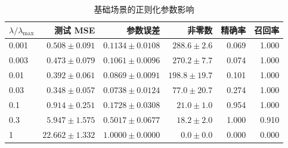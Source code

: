 \begin{table}[htbp]
\centering\small
\caption{基础场景的正则化参数影响}\label{tab:regularization}
\begin{tabular}{lrrrrr}
\toprule
$\lambda/\lambda_{\max}$ & 测试 MSE & 参数误差 & 非零数 & 精确率 & 召回率 \\
\midrule
0.001 & $0.508\pm0.091$ & $0.1134\pm0.0108$ & $288.6\pm2.6$ & 0.069 & 1.000 \\
0.003 & $0.473\pm0.079$ & $0.1061\pm0.0096$ & $270.2\pm7.7$ & 0.074 & 1.000 \\
0.01 & $0.392\pm0.061$ & $0.0869\pm0.0091$ & $198.8\pm19.7$ & 0.101 & 1.000 \\
0.03 & $0.348\pm0.057$ & $0.0738\pm0.0124$ & $77.0\pm20.7$ & 0.274 & 1.000 \\
0.1 & $0.914\pm0.251$ & $0.1728\pm0.0308$ & $21.0\pm1.0$ & 0.954 & 1.000 \\
0.3 & $5.947\pm1.575$ & $0.5017\pm0.0677$ & $18.2\pm2.0$ & 1.000 & 0.910 \\
1 & $22.662\pm1.332$ & $1.0000\pm0.0000$ & $0.0\pm0.0$ & 0.000 & 0.000 \\
\bottomrule
\end{tabular}
\par\vspace{0.3em}{\footnotesize 前 3 项统计量为均值与样本标准差；精确率和召回率列仅列均值。}
\end{table}
